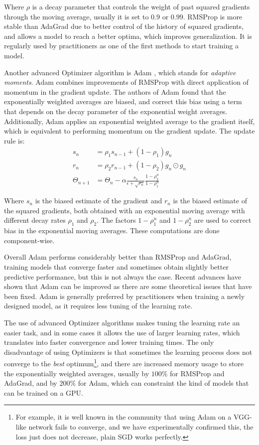 Where $\rho$ is a decay parameter that controls the weight of past squared gradients through the moving average, usually it is set to $0.9$ or $0.99$. RMSProp is more stable than AdaGrad due to better control of the history of squared gradients, and allows a model to reach a better optima, which improves generalization. It is regularly used by practitioners as one of the first methods to start training a model.

Another advanced Optimizer algorithm is Adam \cite[-1cm]{kingma2014adam}, which stands for \textit{adaptive moments}. Adam combines improvements of RMSProp with direct application of momentum in the gradient update. The authors of Adam found that the exponentially weighted averages are biased, and correct this bias using a term that depends on the decay parameter of the exponential weight averages. Additionally, Adam applies an exponential weighted average to the gradient itself, which is equivalent to performing momentum on the gradient update. The update rule is:
\vspace*{1em}
\begin{align}
    s_n &= \rho_1 s_{n-1} + (1 - \rho_1) g_n\nonumber\\
    r_n &= \rho_2 r_{n-1} + (1 - \rho_2) g_n \odot g_n\nonumber\\
    \Theta_{n+1} &= \Theta_{n} - \alpha \frac{s_n}{\epsilon + \sqrt{r_n}} \frac{1 - \rho_2^n}{1 - \rho_1^n}
    \label{background:Adam}
\end{align}

Where $s_n$ is the biased estimate of the gradient and $r_n$ is the biased estimate of the squared gradients, both obtained with an exponential moving average with different decay rates $\rho_1$ and $\rho_2$. The factors $1 - \rho_1^n$ and $1 - \rho_2^n$ are used to correct bias in the exponential moving averages. These computations are done component-wise.

Overall Adam performs considerably better than RMSProp and AdaGrad, training models that converge faster and sometimes obtain slightly better predictive performance, but this is not always the case. Recent advances have shown that Adam can be improved as there are some theoretical issues \cite{reddi2018convergence} that have been fixed.
Adam is generally preferred by practitioners when training a newly designed model, as it requires less tuning of the learning rate.

The use of advanced Optimizer algorithms makes tuning the learning rate an easier task, and in some cases it allows the use of larger learning rates, which translates into faster convergence and lower training times. The only disadvantage of using Optimizers is that sometimes the learning process does not converge to the \textit{best} optimum\footnote{For example, it is well known in the community that using Adam on a VGG-like network fails to converge, and we have experimentally confirmed this, the loss just does not decrease, plain SGD works perfectly.}, and there are increased memory usage to store the exponentially weighted averages, usually by $100 \%$ for RMSProp and AdaGrad, and by $200 \%$ for Adam, which can constraint the kind of models that can be trained on a GPU.

